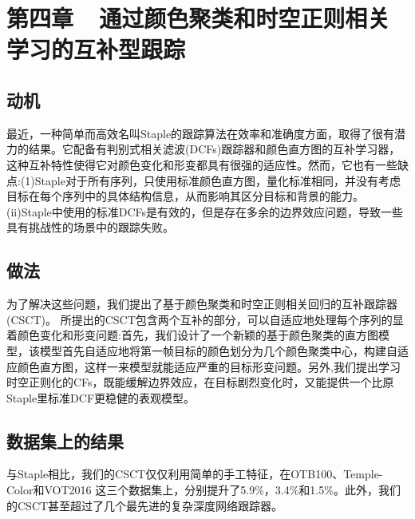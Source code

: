 ﻿\chapter{第四章~~通过颜色聚类和时空正则相关学习的互补型跟踪}
\label{chap03}


\section{动机}
最近，一种简单而高效名叫Staple的跟踪算法在效率和准确度方面，取得了很有潜力的结果。它配备有判别式相关滤波(DCFs)跟踪器和颜色直方图的互补学习器，这种互补特性使得它对颜色变化和形变都具有很强的适应性。然而，它也有一些缺点:(1)Staple对于所有序列，只使用标准颜色直方图，量化标准相同，并没有考虑目标在每个序列中的具体结构信息，从而影响其区分目标和背景的能力。(ii)Staple中使用的标准DCFs是有效的，但是存在多余的边界效应问题，导致一些具有挑战性的场景中的跟踪失败。

\section{做法}
为了解决这些问题，我们提出了基于颜色聚类和时空正则相关回归的互补跟踪器(CSCT)。 所提出的CSCT包含两个互补的部分，可以自适应地处理每个序列的显着颜色变化和形变问题:首先，我们设计了一个新颖的基于颜色聚类的直方图模型，该模型首先自适应地将第一帧目标的颜色划分为几个颜色聚类中心，构建自适应颜色直方图，这样一来模型就能适应严重的目标形变问题。另外,我们提出学习时空正则化的CFs，既能缓解边界效应，在目标剧烈变化时，又能提供一个比原Staple里标准DCF更稳健的表观模型。
\section{数据集上的结果}

与Staple相比，我们的CSCT仅仅利用简单的手工特征，在OTB100、Temple-Color和VOT2016 这三个数据集上，分别提升了5.9\%，3.4\%和1.5\%。此外，我们的CSCT甚至超过了几个最先进的复杂深度网络跟踪器。





